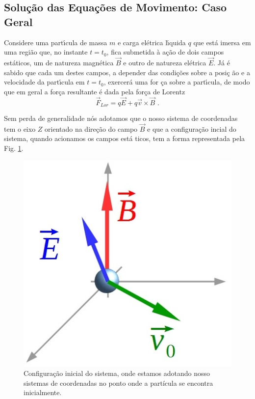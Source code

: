 \documentclass[twocolumn]{rbef}
\newcommand{\1}{\mathbbm{1}}
\begin{document}
\subsection{Solução das Equações de Movimento: Caso
  Geral} \label{Solucao}

Considere uma part\'{\i}cula de massa $m$ e carga el\'{e}trica
l\'{\i}quida $%
q$ que est\'{a} imersa em uma regi\~{a}o que, no instante $t=t_{0}$,
fica submetida à ação de dois campos est\'{a}ticos, um de natureza
magn\'{e}tica $%
\vec{B}$ e outro de natureza el\'{e}trica $\vec{E}$. J\'{a} \'{e} sabido
que cada um destes campos, a depender das condi\c{c}\~{o}es sobre a
posi\c{c}%
\~{a}o e a velocidade da part\'{\i}cula em $t=t_{0}$, exercer\'{a} uma
for%
\c{c}a sobre a part\'{\i}cula, de modo que em geral a for\c{c}a
resultante \'{e} dada pela for\c{c}a de Lorentz%
\begin{equation}
  \vec{F}_{Lor}=q\vec{E}+q\vec{v}\times \vec{B} \text{ .} \label{resultante}
\end{equation}

Sem perda de generalidade n\'{o}s adotamos que o nosso sistema de
coordenadas tem o eixo $Z$ orientado na dire\c{c}\~{a}o do campo
$\vec{B}$ e que a configura\c{c}\~{a}o incial do sistema, quando
acionamos os campos est\'{a}%
ticos, tem a forma representada pela Fig. \ref{Esquemainicial}.

\begin{figure}[!htb]
  \centering \includegraphics[scale=0.3]{Esquemainicial.jpg}
  \caption{Configuração inicial do sistema, onde estamos adotando nosso
    sistemas de coordenadas no ponto onde a partícula se encontra
    inicialmente.}
  \label{Esquemainicial}
\end{figure}
\end{document}

